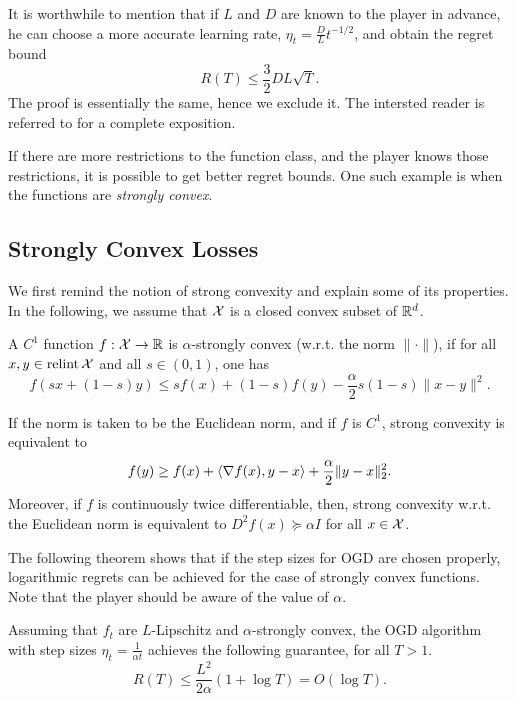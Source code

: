 \begin{remark}
    It is worthwhile to mention that if $L$ and $D$ are known to the player in advance, he can choose a more accurate learning rate, $\eta_t = \frac{D}{L}t^{-1/2}$, and obtain the regret bound
\[
    R(T) \leq \frac{3}{2}DL\sqrt{T}.
\]
The proof is essentially the same, hence we exclude it. The intersted reader is referred to \citet{hazan2015} for a complete exposition.
\end{remark}

If there are more restrictions to the function class, and the player knows those restrictions, it is possible to get better regret bounds. One such example is when the functions are \emph{strongly convex}.

\subsection{Strongly Convex Losses}
We first remind the notion of strong convexity and explain some of its properties. In the following, we assume that $\mathcal{X}$ is a closed convex subset of $\mathbb{R}^d$.

\begin{definition}
    A $C^1$ function $f:\mathcal{X}\to\mathbb{R}$ is $\alpha$-strongly convex (w.r.t. the norm $\|\cdot\|$), if for all $x,y\in\mathop{\mathrm{relint}}\mathcal{X}$ and all $s \in (0,1)$, one has
    \[
        f(sx + (1-s)y) \leq sf(x) + (1-s)f(y) - \frac{\alpha}{2}s(1-s)\|x-y\|^2.
    \]
\end{definition}

\begin{remark}
    If the norm is taken to be the Euclidean norm, and if $f$ is $C^1$, strong convexity is equivalent to 
    \[
        f(y) \geq f(x) + \left\langle \nabla f(x),y-x \right\rangle + \frac{\alpha}{2}\|y-x\|_2^2.
    \]
    Moreover, if $f$ is continuously twice differentiable, then, strong convexity w.r.t. the Euclidean norm is equivalent to $D^2 f(x) \succeq \alpha I$ for all $x\in\mathcal{X}$.
\end{remark}

The following theorem shows that if the step sizes for OGD are chosen properly, logarithmic regrets can be achieved for the case of strongly convex functions. Note that the player should be aware of the value of $\alpha$.

\begin{theorem}\label{thm:ogdsc}
    Assuming that $f_t$ are $L$-Lipschitz and $\alpha$-strongly convex, the OGD algorithm with step sizes $\eta_t = \frac{1}{\alpha t}$ achieves the following guarantee, for all $T > 1$.
    \[
        R(T) \leq \frac{L^2}{2\alpha} (1+\log T) = O(\log T).
    \]
\end{theorem}

